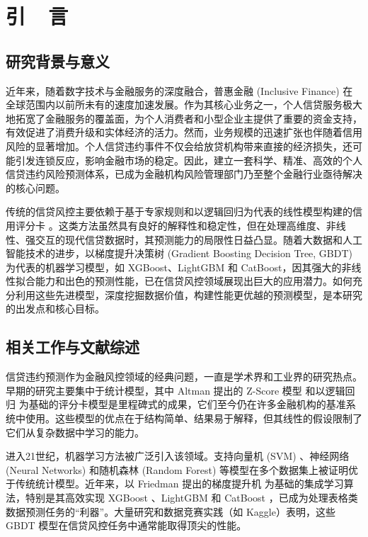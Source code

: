 \documentclass{thuemp}
\begin{document}



\wuhao 

\section{引~~言}
\enlargethispage{-3.3cm}
\subsection{研究背景与意义}
近年来，随着数字技术与金融服务的深度融合，普惠金融 (Inclusive Finance) 在全球范围内以前所未有的速度加速发展。作为其核心业务之一，个人信贷服务极大地拓宽了金融服务的覆盖面，为个人消费者和小型企业主提供了重要的资金支持，有效促进了消费升级和实体经济的活力。然而，业务规模的迅速扩张也伴随着信用风险的显著增加。个人信贷违约事件不仅会给放贷机构带来直接的经济损失，还可能引发连锁反应，影响金融市场的稳定。因此，建立一套科学、精准、高效的个人信贷违约风险预测体系，已成为金融机构风险管理部门乃至整个金融行业亟待解决的核心问题。

传统的信贷风控主要依赖于基于专家规则和以逻辑回归为代表的线性模型构建的信用评分卡 \citep{siddiqi1997statistical}。这类方法虽然具有良好的解释性和稳定性，但在处理高维度、非线性、强交互的现代信贷数据时，其预测能力的局限性日益凸显。随着大数据和人工智能技术的进步，以梯度提升决策树 (Gradient Boosting Decision Tree, GBDT) 为代表的机器学习模型，如 XGBoost、LightGBM 和 CatBoost，因其强大的非线性拟合能力和出色的预测性能，已在信贷风控领域展现出巨大的应用潜力。如何充分利用这些先进模型，深度挖掘数据价值，构建性能更优越的预测模型，是本研究的出发点和核心目标。

\subsection{相关工作与文献综述}
信贷违约预测作为金融风控领域的经典问题，一直是学术界和工业界的研究热点。早期的研究主要集中于统计模型，其中 Altman 提出的 Z-Score 模型 \citep{altman1968financial} 和以逻辑回归 \citep{hosmer2013applied} 为基础的评分卡模型是里程碑式的成果，它们至今仍在许多金融机构的基准系统中使用。这些模型的优点在于结构简单、结果易于解释，但其线性的假设限制了它们从复杂数据中学习的能力。

进入21世纪，机器学习方法被广泛引入该领域。支持向量机 (SVM) \citep{cortes1995support}、神经网络 (Neural Networks) \citep{west2000neural} 和随机森林 (Random Forest) \citep{breiman2001random} 等模型在多个数据集上被证明优于传统统计模型。近年来，以 Friedman 提出的梯度提升机 \citep{friedman2001greedy} 为基础的集成学习算法，特别是其高效实现 XGBoost \citep{chen2016xgboost}、LightGBM \citep{ke2017lightgbm} 和 CatBoost \citep{prokhorenkova2018catboost}，已成为处理表格类数据预测任务的“利器”。大量研究和数据竞赛实践（如 Kaggle）表明，这些 GBDT 模型在信贷风控任务中通常能取得顶尖的性能。
\end{document}
